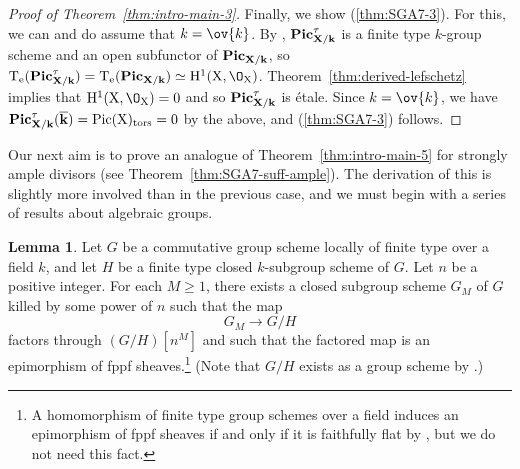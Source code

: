 \documentclass[11pt,reqno]{amsart}
\numberwithin{equation}{section}
\theoremstyle{definition}
\newtheorem{lemma}[thm]{Lemma}
\begin{document}
\begin{proof}[Proof of Theorem~\ref{thm:intro-main-3}]
    Finally, we show (\ref{thm:SGA7-3}). For this, we can and do assume that $k=\ov{k}$. By \cite[Exp.\ XII, Cor.\ 1.5, Exp.\ XIII, Thm.\ 4.7]{SGA6}, $\bf{Pic}^\tau_{X/k}$ is a finite type $k$-group scheme and an open subfunctor of $\bf{Pic}_{X/k}$, so $\rm{T}_e(\bf{Pic}^\tau_{X/k})=\rm{T}_e(\bf{Pic}_{X/k})\simeq \rm{H}^1(X, \O_X)$. Theorem~\ref{thm:derived-lefschetz} implies that $\rm{H}^1(X, \O_X)=0$ and so $\bf{Pic}^\tau_{X/k}$ is \'etale. Since $k = \ov{k}$, we have $\bf{Pic}^\tau_{X/k}(\overline{k}) = \rm{Pic}(X)_{\rm{tors}} = 0$ by the above, and (\ref{thm:SGA7-3}) follows. 
\end{proof}

Our next aim is to prove an analogue of Theorem~\ref{thm:intro-main-5} for strongly ample divisors (see Theorem~\ref{thm:SGA7-suff-ample}). The derivation of this is slightly more involved than in the previous case, and we must begin with a series of results about algebraic groups.

\begin{lemma}\label{lemma:torsion-in-quotient}
Let $G$ be a commutative group scheme locally of finite type over a field $k$, and let $H$ be a finite type closed $k$-subgroup scheme of $G$. Let $n$ be a positive integer. For each $M \geq 1$, there exists a closed subgroup scheme $G_M$ of $G$ killed by some power of $n$ such that the map
\[
G_M \to G/H
\]
factors through $(G/H)[n^M]$ and such that the factored map is an epimorphism of fppf sheaves.\footnote{A homomorphism of finite type group schemes over a field induces an epimorphism of fppf sheaves if and only if it is faithfully flat by \cite[Exp.\,VI$_\text{B}$, Rmk.\ 9.2.2]{SGA3}, but we do not need this fact.} (Note that $G/H$ exists as a group scheme by \cite[Exp.\ VI\textsubscript{A}, Thm.\ 3.2]{SGA3}.)
\end{lemma}
\end{document}
